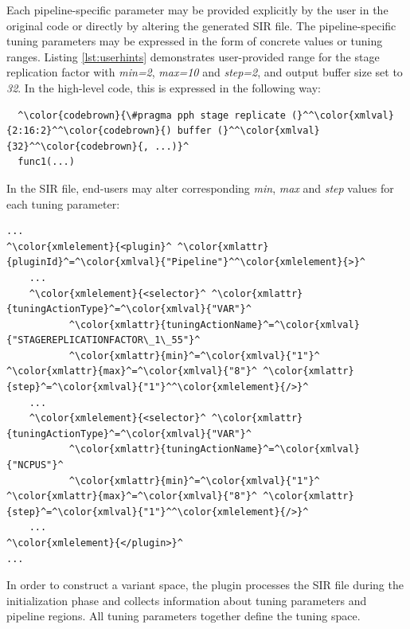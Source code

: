 \documentclass[11pt,a4paper, oneside]{book} %
\begin{document}

Each pipeline-specific parameter may be provided explicitly by the user in the original code or directly by altering the generated SIR file. The pipeline-specific tuning parameters may be expressed in the form of concrete values or tuning ranges. Listing \ref{lst:userhints} demonstrates user-provided range for the stage replication factor with \emph{min=2}, \emph{max=10} and \emph{step=2}, and output buffer size set to \emph{32}.
In the high-level code, this is expressed in the following way:

\begin{lstlisting}
  ^\color{codebrown}{\#pragma pph stage replicate (}^^\color{xmlval}{2:16:2}^^\color{codebrown}{) buffer (}^^\color{xmlval}{32}^^\color{codebrown}{, ...)}^
  func1(...)
\end{lstlisting}

In the SIR file, end-users may alter corresponding \textit{min}, \textit{max} and \textit{step} values for each tuning parameter:

\begin{lstlisting}
...
^\color{xmlelement}{<plugin}^ ^\color{xmlattr}{pluginId}^=^\color{xmlval}{"Pipeline"}^^\color{xmlelement}{>}^
	...
	^\color{xmlelement}{<selector}^ ^\color{xmlattr}{tuningActionType}^=^\color{xmlval}{"VAR"}^
           ^\color{xmlattr}{tuningActionName}^=^\color{xmlval}{"STAGEREPLICATIONFACTOR\_1\_55"}^
           ^\color{xmlattr}{min}^=^\color{xmlval}{"1"}^ ^\color{xmlattr}{max}^=^\color{xmlval}{"8"}^ ^\color{xmlattr}{step}^=^\color{xmlval}{"1"}^^\color{xmlelement}{/>}^
	...
	^\color{xmlelement}{<selector}^ ^\color{xmlattr}{tuningActionType}^=^\color{xmlval}{"VAR"}^
           ^\color{xmlattr}{tuningActionName}^=^\color{xmlval}{"NCPUS"}^
           ^\color{xmlattr}{min}^=^\color{xmlval}{"1"}^ ^\color{xmlattr}{max}^=^\color{xmlval}{"8"}^ ^\color{xmlattr}{step}^=^\color{xmlval}{"1"}^^\color{xmlelement}{/>}^
	...
^\color{xmlelement}{</plugin>}^
...
\end{lstlisting}

In order to construct a variant space, the plugin processes the SIR file during the initialization phase and collects information about tuning parameters and pipeline regions. All tuning parameters together define the tuning space.
\end{document}
